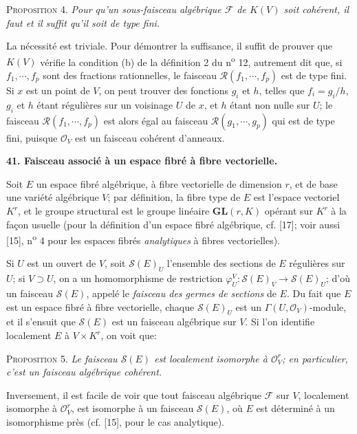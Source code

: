 \textsc{Proposition} 4. \textit{Pour qu'un sous-faisceau algébrique $\mathcal{F}$ de $K(V)$ soit cohérent, il faut et il suffit qu'il soit de type fini.}

La nécessité est triviale. Pour démontrer la suffisance, il suffit de prouver que $K(V)$ vérifie la condition (b) de la définition 2 du n\textsuperscript{o} 12, autrement dit que, si $f_1, \cdots, f_p$ sont des fractions rationnelles, le faisceau $\mathcal{R}(f_1, \cdots, f_p)$ est de type fini. Si $x$ est un point de $V$, on peut trouver des fonctions $g_i$ et $h$, telles que $f_i = g_i/h$, $g_i$ et $h$ étant régulières sur un voisinage $U$ de $x$, et $h$ étant non nulle
sur $U$; le faisceau $\mathcal{R}(f_1, \cdots, f_p)$ est alors égal au faisceau $\mathcal{R}(g_1, \cdots, g_p)$ qui est de type fini, puisque $\mathcal{O}_V$ est un faisceau cohérent d'anneaux.


\textbf{41. Faisceau associé à un espace fibré à fibre vectorielle.}

Soit $E$ un espace fibré algébrique, à fibre vectorielle de dimension $r$, et de base une variété algébrique $V$; par définition, la fibre type de $E$ est l'espace vectoriel $K^r$, et le groupe structural est le groupe linéaire $\mathbf{GL}(r, K)$ opérant sur $K^r$ à la façon usuelle (pour la définition d'un espace fibré algébrique, cf. [17]; voir aussi [15], n\textsuperscript{o} 4 pour les espaces fibrés \textit{analytiques} à fibres vectorielles).

Si $U$ est un ouvert de $V$, soit $\mathcal{S}(E)_U$ l'ensemble des sections de $E$ régulières sur $U$; si $V \supset U$, on a un homomorphisme de restriction $\varphi_U^V : \mathcal{S}(E)_V \rightarrow \mathcal{S}(E)_U$; d'où un faisceau $\mathcal{S}(E)$, appelé le \textit{faisceau des germes de sections} de $E$. Du fait que $E$ est un espace fibré à fibre vectorielle, chaque $\mathcal{S}(E)_U$ est un $\Gamma(U, \mathcal{O}_V)$-module, et il s'ensuit que $\mathcal{S}(E)$ est un faisceau algébrique sur $V$. Si l'on identifie localement $E$ à $V \times K^r$, on voit que:

\textsc{Proposition} 5. \textit{Le faisceau $\mathcal{S}(E)$ est localement isomorphe à $\mathcal{O}_V^r$; en particulier, c'est un faisceau algébrique cohérent.}

Inversement, il est facile de voir que tout faisceau algébrique $\mathcal{F}$ sur $V$, localement isomorphe à $\mathcal{O}_V^r$, est isomorphe à un faisceau $\mathcal{S}(E)$, où $E$ est déterminé à un isomorphisme près (cf. [15], pour le cas analytique).

